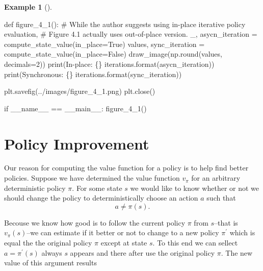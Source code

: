 \documentclass[
  letterpaper,
]{krantz}
\makeatletter
\newenvironment{Shaded}{\begin{snugshade}}{\end{snugshade}}
\newcommand{\BuiltInTok}[1]{\textcolor[rgb]{0.00,0.23,0.31}{#1}}
\newcommand{\CommentTok}[1]{\textcolor[rgb]{0.37,0.37,0.37}{#1}}
\newcommand{\ControlFlowTok}[1]{\textcolor[rgb]{0.00,0.23,0.31}{#1}}
\newcommand{\DecValTok}[1]{\textcolor[rgb]{0.68,0.00,0.00}{#1}}
\newcommand{\KeywordTok}[1]{\textcolor[rgb]{0.00,0.23,0.31}{#1}}
\newcommand{\NormalTok}[1]{\textcolor[rgb]{0.00,0.23,0.31}{#1}}
\newcommand{\OperatorTok}[1]{\textcolor[rgb]{0.37,0.37,0.37}{#1}}
\newcommand{\SpecialCharTok}[1]{\textcolor[rgb]{0.37,0.37,0.37}{#1}}
\newcommand{\StringTok}[1]{\textcolor[rgb]{0.13,0.47,0.30}{#1}}
\newcommand{\VariableTok}[1]{\textcolor[rgb]{0.07,0.07,0.07}{#1}}
\newenvironment{kframe}{%
\medskip{}
\setlength{\fboxsep}{.8em}
 \def\at@end@of@kframe{}%
 \ifinner\ifhmode%
  \def\at@end@of@kframe{\end{minipage}}%
  \begin{minipage}{\columnwidth}%
 \fi\fi%
 \def\FrameCommand##1{\hskip\@totalleftmargin \hskip-\fboxsep
 \colorbox{shadecolor}{##1}\hskip-\fboxsep
     \hskip-\linewidth \hskip-\@totalleftmargin \hskip\columnwidth}%
 \MakeFramed {\advance\hsize-\width
   \@totalleftmargin\z@ \linewidth\hsize
   \@setminipage}}%
 {\par\unskip\endMakeFramed%
 \at@end@of@kframe}
\renewenvironment{Shaded}{\begin{kframe}}{\end{kframe}}
\theoremstyle{plain}
\theoremstyle{definition}
\newtheorem{example}{Example}[chapter]
\theoremstyle{definition}
\theoremstyle{remark}
\makeatother
\begin{document}
\begin{example}[]
\begin{tcolorbox}[enhanced jigsaw, bottomrule=.15mm, opacityback=0, breakable, colframe=quarto-callout-tip-color-frame, left=2mm, rightrule=.15mm, toprule=.15mm, leftrule=.75mm, arc=.35mm, colback=white]
\begin{codelisting}[H]
\begin{Shaded}
\begin{Highlighting}[]
\KeywordTok{def}\NormalTok{ figure\_4\_1():}
    \CommentTok{\# While the author suggests using in{-}place iterative policy evaluation,}
    \CommentTok{\# Figure 4.1 actually uses out{-}of{-}place version.}
\NormalTok{    \_, asycn\_iteration }\OperatorTok{=}\NormalTok{ compute\_state\_value(in\_place}\OperatorTok{=}\VariableTok{True}\NormalTok{)}
\NormalTok{    values, sync\_iteration }\OperatorTok{=}\NormalTok{ compute\_state\_value(in\_place}\OperatorTok{=}\VariableTok{False}\NormalTok{)}
\NormalTok{    draw\_image(np.}\BuiltInTok{round}\NormalTok{(values, decimals}\OperatorTok{=}\DecValTok{2}\NormalTok{))}
    \BuiltInTok{print}\NormalTok{(}\StringTok{\textquotesingle{}In{-}place: }\SpecialCharTok{\{\}}\StringTok{ iterations\textquotesingle{}}\NormalTok{.}\BuiltInTok{format}\NormalTok{(asycn\_iteration))}
    \BuiltInTok{print}\NormalTok{(}\StringTok{\textquotesingle{}Synchronous: }\SpecialCharTok{\{\}}\StringTok{ iterations\textquotesingle{}}\NormalTok{.}\BuiltInTok{format}\NormalTok{(sync\_iteration))}

\NormalTok{    plt.savefig(}\StringTok{\textquotesingle{}../images/figure\_4\_1.png\textquotesingle{}}\NormalTok{)}
\NormalTok{    plt.close()}


\ControlFlowTok{if} \VariableTok{\_\_name\_\_} \OperatorTok{==} \StringTok{\textquotesingle{}\_\_main\_\_\textquotesingle{}}\NormalTok{:}
\NormalTok{    figure\_4\_1()}
\end{Highlighting}
\end{Shaded}

\end{codelisting}

\end{tcolorbox}

\end{example}

\section{Policy Improvement}\label{policy-improvement}

Our reason for computing the value function for a policy is to help find
better policies. Suppose we have determined the value function
\(v_{\pi}\) for an arbitrary deterministic policy \(\pi\). For some
state \(s\) we would like to know whether or not we should change the
policy to deterministically choose an action \(a\) such that \[
    a 
    \neq \pi(s).
\]

Becouse we know how good is to follow the current policy \(\pi\) from
\(s\)--that is \(v_{\pi}(s)\)--we can estimate if it better or not to
change to a new policy \(\pi^{\prime}\) which is equal the the original
policy \(\pi\) except at state \(s\). To this end we can sellect
\(a = \pi^{\prime}(s)\) always \(s\) appears and there after use the
original policy \(\pi\). The new value of this argument results
\end{document}
